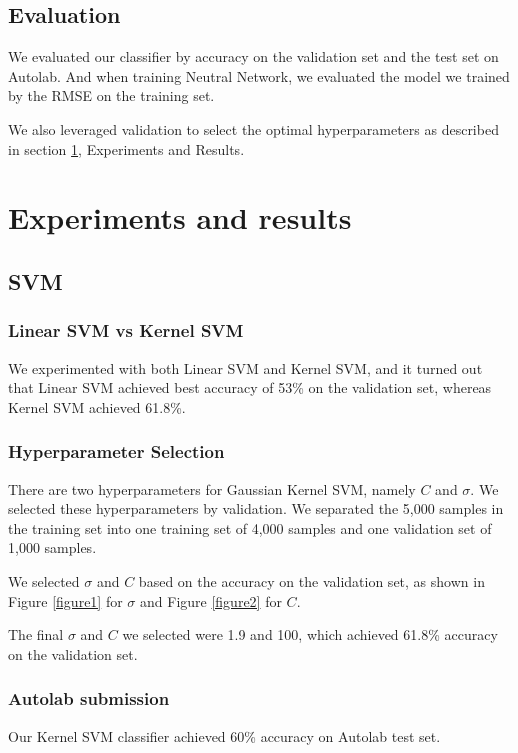 \documentclass{article} %
\begin{document}
\subsection{Evaluation}

We evaluated our classifier by accuracy on the validation set and the test set on Autolab. And when training Neutral Network, we evaluated the model we trained by the RMSE on the training set.

We also leveraged validation to select the optimal hyperparameters as described in section \ref{experiments}, Experiments and Results.

\section{Experiments and results}
\label{experiments}

\subsection{SVM}

\subsubsection{Linear SVM vs Kernel SVM}
We experimented with both Linear SVM and Kernel SVM, and it turned out that Linear SVM achieved best accuracy of 53\% on the validation set, whereas Kernel SVM achieved 61.8\%.

\subsubsection{Hyperparameter Selection}

There are two hyperparameters for Gaussian Kernel SVM, namely $C$ and $\sigma$. We selected these hyperparameters by validation. We separated the 5,000 samples in the training set into one training set of 4,000 samples and one validation set of 1,000 samples.

We selected $\sigma$ and $C$ based on the accuracy on the validation set, as shown in Figure \ref{figure1} for $\sigma$ and Figure \ref{figure2} for $C$. 

The final $\sigma$ and $C$ we selected were 1.9 and 100, which achieved 61.8\% accuracy on the validation set.

\subsubsection{Autolab submission}
Our Kernel SVM classifier achieved 60\% accuracy on Autolab test set.
\end{document}
